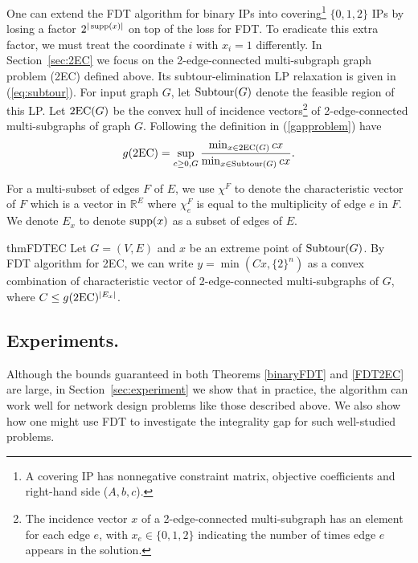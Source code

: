 One can extend the FDT algorithm for binary IPs into covering\footnote{A covering IP has nonnegative constraint matrix, objective coefficients and right-hand side ($A,b,c$).} $\{0,1,2\}$ IPs by losing a factor $2^{|\operatorname{supp}(x)|}$ on top of the loss for FDT. To eradicate this extra factor, we must treat the coordinate $i$ with $x_i=1$ differently. In Section~\ref{sec:2EC} we focus on the 2-edge-connected multi-subgraph graph problem (2EC) defined above.  Its subtour-elimination LP relaxation is given in (\ref{eq:subtour}).
For input graph $G$, let $\operatorname{{Subtour}}(G)$ denote the feasible region of this LP. Let $\2ec(G)$ be the convex hull of incidence vectors\footnote{The incidence vector $x$ of a 2-edge-connected multi-subgraph has an element for each edge $e$, with $x_e \in \{0,1,2\}$ indicating the number of times edge $e$ appears in the solution.} of 2-edge-connected multi-subgraphs of graph $G$. Following the definition in (\ref{gapproblem}) have
\begin{equation}
g(\2ec) = \sup_{c\geq 0 , G}\frac{\min_{x\in \2ec(G)} cx}{\min_{x\in \subtour(G)} cx}.
\end{equation}

For a multi-subset of edges $F$ of $E$, we use $\chi^F$ to denote the characteristic vector of $F$ which is a vector in $\mathbb{R}^E$ where $\chi^F_e$ is equal to the multiplicity of edge $e$ in $F$. We denote $E_x$ to denote $\operatorname{supp}(x)$ as a subset of edges of $E$.

\begin{restatable}{thm}{FDTEC}
	\label{FDT2EC}
	Let $G=(V,E)$ and $x$ be an extreme point of  $\operatorname{{Subtour}}(G)$. By FDT algorithm for 2EC, we can write $y= \min(Cx,\{2\}^n)$ as a convex combination of characteristic vector of 2-edge-connected multi-subgraphs of $G$, where $C\leq g(\2ec)^{|E_x|}$.
\end{restatable}

\subsection{Experiments.} Although the bounds guaranteed in both Theorems \ref{binaryFDT} and \ref{FDT2EC} are large, in Section~\ref{sec:experiment} we show that in practice, the algorithm can work well for network design problems like those described above. We also show how one might use FDT to investigate the integrality gap for such well-studied problems.




